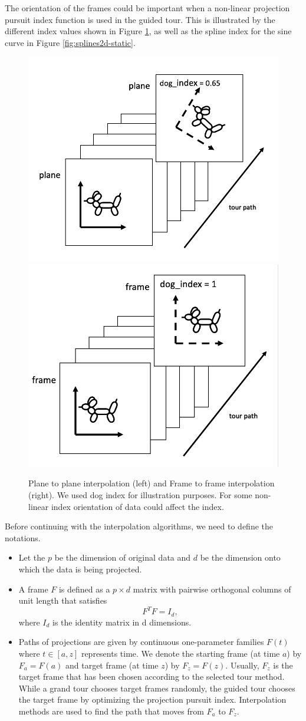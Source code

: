 The orientation of the frames could be important when a non-linear projection pursuit index function is used in the guided tour. This is illustrated by the different index values shown in Figure \ref{fig:dogs}, as well as the spline index for the sine curve in Figure \ref{fig:splines2d-static}.

\begin{figure}

{\centering \includegraphics[width=0.45\linewidth]{plane} \includegraphics[width=0.45\linewidth]{frame} 

}

\caption{Plane to plane interpolation (left) and Frame to frame interpolation (right). We used dog index for illustration purposes. For some non-linear index orientation of data could affect the index.}\label{fig:dogs}
\end{figure}

Before continuing with the interpolation algorithms, we need to define the notations.

\begin{itemize}
\item
  Let the \(p\) be the dimension of original data and \(d\) be the dimension onto which the data is being projected.
\item
  A frame \(F\) is defined as a \(p\times d\) matrix with pairwise orthogonal columns of unit length that satisfies
  \[F^TF = I_d,\]
  where \(I_d\) is the identity matrix in d dimensions.
\item
  Paths of projections are given by continuous one-parameter families \(F(t)\) where \(t\in [a, z]\) represents time. We denote the starting frame (at time \(a\)) by \(F_a = F(a)\) and target frame (at time \(z\)) by \(F_z = F(z)\). Usually, \(F_z\) is the target frame that has been chosen according to the selected tour method. While a grand tour chooses target frames randomly, the guided tour chooses the target frame by optimizing the projection pursuit index. Interpolation methods are used to find the path that moves from \(F_a\) to \(F_z\).
\end{itemize}

